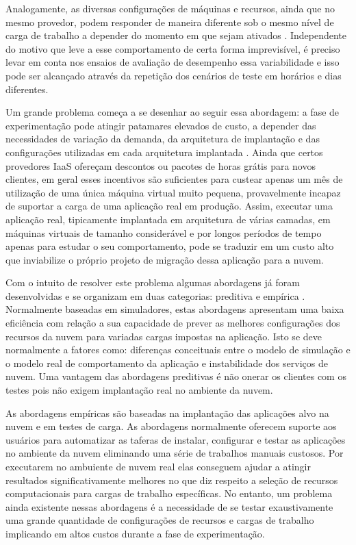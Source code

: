Analogamente, as diversas configurações de máquinas e recursos, ainda que no mesmo 
provedor, podem responder de maneira diferente sob o mesmo nível de carga de 
trabalho a depender do momento em que sejam ativados \cite{cunha2011investigating, 
iosup2011performance, jayasinghe2011variations}. Independente do motivo que leve 
a esse comportamento de certa forma imprevisível, é preciso levar em conta nos 
ensaios de avaliação de desempenho essa variabilidade e isso pode ser alcançado 
através da repetição dos cenários de teste em horários e dias diferentes.

Um grande problema começa a se desenhar ao seguir essa abordagem: a fase de
experimentação pode atingir patamares elevados de custo, a depender das
necessidades de variação da demanda, da arquitetura de implantação e das 
configurações utilizadas em cada arquitetura implantada \cite{silva2013cloudbench}. 
Ainda que certos provedores IaaS ofereçam descontos ou pacotes de horas grátis 
para novos clientes, em geral esses incentivos são suficientes para custear apenas 
um mês de utilização de uma única máquina virtual muito pequena, provavelmente 
incapaz de suportar a carga de uma aplicação real em produção. Assim, executar 
uma aplicação real, tipicamente implantada em arquitetura de várias camadas, em 
máquinas virtuais de tamanho considerável e por longos períodos de tempo apenas 
para estudar o seu comportamento, pode se traduzir em um custo alto que inviabilize 
o próprio projeto de migração dessa aplicação para a nuvem. 

Com o intuito de resolver este problema algumas abordagens já
foram desenvolvidas e se organizam em duas categorias: preditiva \cite{cloudharmony,
malkowski2010cloudxplor, fittkau2012cdosim, li2011cloudprophet} e empírica 
\cite{jayasinghe2012, silva2013cloudbench, cunhacloud, scheuner2014cloud}.
Normalmente baseadas em simuladores, estas abordagens apresentam uma baixa
eficiência \cite{XXXXXXXXXXXXXX} com relação a sua capacidade de prever as
melhores configurações dos recursos da nuvem para variadas cargas impostas na 
aplicação. Isto se deve normalmente a fatores como: diferenças conceituais entre 
o modelo de simulação e o modelo real de comportamento da aplicação e instabilidade 
dos serviços de nuvem. Uma vantagem das abordagens preditivas é não onerar os 
clientes com os testes pois não exigem implantação real no ambiente da nuvem.

As abordagens empíricas são baseadas na implantação das aplicações alvo na nuvem 
e em testes de carga. As abordagens normalmente oferecem suporte aos usuários
para automatizar as taferas de instalar, configurar e testar as aplicações no
ambiente da nuvem eliminando uma série de trabalhos manuais custosos. Por
executarem no ambuiente de nuvem real elas conseguem ajudar a atingir resultados
significativamente melhores no que diz respeito a seleção de recursos
computacionais para cargas de trabalho específicas. No entanto, um problema ainda 
existente nessas abordagens é a necessidade de se testar exaustivamente uma grande 
quantidade de configurações de recursos e cargas de trabalho implicando em altos 
custos durante a fase de experimentação.

